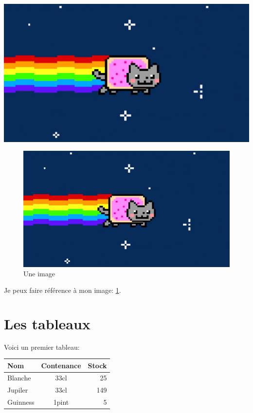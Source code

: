 \documentclass[a4paper,11pt]{article}
\begin{document}
	\includegraphics[scale=0.15]{images/nyan-cat.png}
	
	\blindtext
	
	\newpage
	\begin{figure}[hbt]%
		\centering
		\includegraphics[scale=0.15]{images/nyan-cat.png}
		\caption{Une image}
		\label{img:mon-image}
	\end{figure}
	
	Je peux faire référence à mon image: \ref{img:mon-image}.
	
	\newpage
	\section{Les tableaux}
	
	Voici un premier tableau:
	
	\begin{tabular}{|l|| c |r|} %
		\hline
		Nom & Contenance & Stock\\
		\hline
		\hline
		Blanche & 33cl & 25\\
		Jupiler & 33cl & 149\\
		Guinness & 1pint & 5\\
		\hline
	\end{tabular}
	
\end{document}
